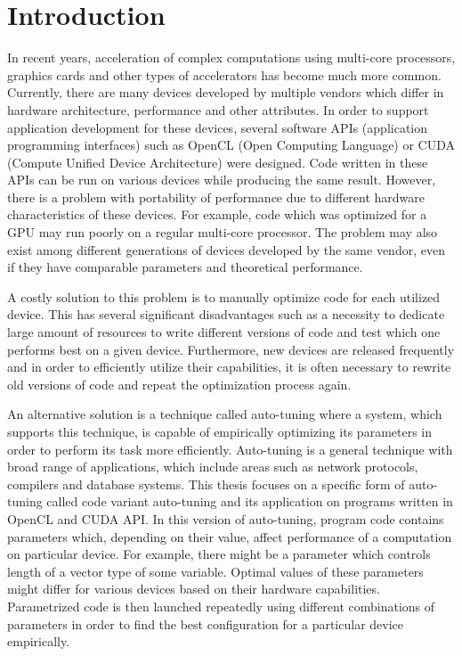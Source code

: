\documentclass
[
    digital, %
    oneside, %
    table, %
    nolof, %
    nolot, %
    nocover %
]{fithesis3}
\begin{document}
\chapter{Introduction}
In recent years, acceleration of complex computations using multi-core processors, graphics cards and other types of accelerators has become
much more common. Currently, there are many devices developed by multiple vendors which differ in hardware architecture, performance and other
attributes. In order to support application development for these devices, several software APIs (application programming interfaces) such as
OpenCL (Open Computing Language) or CUDA (Compute Unified Device Architecture) were designed. Code written in these APIs can be run on various
devices while producing the same result. However, there is a problem with portability of performance due to different hardware characteristics of
these devices. For example, code which was optimized for a GPU may run poorly on a regular multi-core processor. The problem may also exist among
different generations of devices developed by the same vendor, even if they have comparable parameters and theoretical performance.

A costly solution to this problem is to manually optimize code for each utilized device. This has several significant disadvantages such as
a necessity to dedicate large amount of resources to write different versions of code and test which one performs best on a given device. Furthermore,
new devices are released frequently and in order to efficiently utilize their capabilities, it is often necessary to rewrite old versions of code and
repeat the optimization process again.

An alternative solution is a technique called auto-tuning where a system, which supports this technique, is capable of empirically optimizing its
parameters in order to perform its task more efficiently. Auto-tuning is a general technique with broad range of applications, which include areas such
as network protocols, compilers and database systems. This thesis focuses on a specific form of auto-tuning called code variant auto-tuning and its
application on programs written in OpenCL and CUDA API. In this version of auto-tuning, program code contains parameters which, depending on their value,
affect performance of a computation on particular device. For example, there might be a parameter which controls length of a vector type of some variable.
Optimal values of these parameters might differ for various devices based on their hardware capabilities. Parametrized code is then launched repeatedly
using different combinations of parameters in order to find the best configuration for a particular device empirically.
\end{document}
